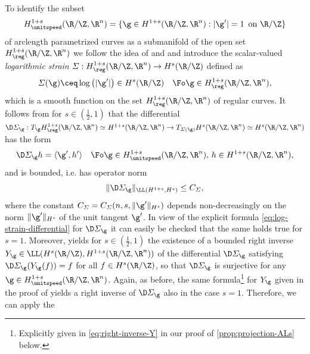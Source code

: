 To identify the subset 
\begin{equation}\label{eq:arclenth-set}
H^{1+s}_\unitspeed(\R/\Z,\R^n)=\{\g\in H^{1+s}(\R/\Z,\R^n):|\g'|=1\,
\textnormal{
on $\R/\Z$}\}
\end{equation}
of arclength parametrized curves as a submanifold of the open set
$H^{1+s}_\reg(\R/\Z,\R^n)$ we follow the idea of 
\cite[Section 2]{scholtes-etal_2022} and
\cite{knappmann-etal_2023} and introduce
the scalar-valued \emph{logarithmic strain}
$\varSigma:H^{1+s}_\reg(\R/\Z,\R^n)\to H^s(\R/\Z)$ defined as
\begin{equation}\label{eq:logarithmic-strain}
	\varSigma(\g) \ceq \log\big( |\g'|\big)  \in H^s(\R/\Z) \quad\Fo \g\in H^{1+s}_\reg(\R/\Z,\R^n),
\end{equation}
which is a smooth function on the set $H^{1+s}_\reg(\R/\Z,\R^n)$ of
regular curves. It follows from \cite[Proposition 5.1]{knappmann-etal_2023}
for $s\in (\frac{1}{2},1)$
that the differential $\D\varSigma_\g:T_\g H^{1+s}_\reg(\R/\Z,\R^n)
\simeq H^{1+s}(\R/\Z,\R^n)\to T_{\varSigma(\g)}H^s(\R/\Z,\R^n)\simeq
H^s(\R/\Z,\R^n)$ has the form
\begin{equation}\label{eq:log-strain-differential}
	\D\varSigma_\g h=\langle\g',h'\rangle \quad\Fo
	\g\in H^{1+s}_\unitspeed(\R/\Z,\R^n),\, h\in H^{1+s}(\R/\Z,\R^n),
\end{equation}
and is bounded, i.e. has operator norm
\begin{equation}\label{eq:log-strain-bounded-differential}
\|\D\varSigma_\g\|_{\LL(H^{1+s},H^s)}\le C_\varSigma,
\end{equation}
where the constant  $C_\varSigma=C_\varSigma(n,s,\|\g'\|_{H^s})$
depends 
non-decreasingly on the norm $\|\g'\|_{H^s}$
of the unit tangent $\g'$. In view of the explicit
formula \cref{eq:log-strain-differential}
for $\D\varSigma_\g$ it can easily be checked that
the same holds true for $s=1$.
Moreover, \cite[Lemma 5.2]{knappmann-etal_2023}
yields for $s\in (\frac{1}{2},1)$
the existence of a bounded right inverse $Y_\g\in
\LL(H^s(\R/\Z),H^{1+s}(\R/\Z,\R^n))$ of the differential $\D\varSigma_\g$ 
satisfying
$\D\varSigma_\g(Y_\g(f))=f$ for all $f\in H^s(\R/\Z)$,
so that $\D\varSigma_\g$ is surjective for any
$\g\in H^{1+s}_\unitspeed(\R/\Z,\R^n)$. Again, as before, 
the same formula\footnote{Explicitly given in \cref{eq:right-inverse-Y}
in our proof
of \cref{prop:projection-ALs} below.}
for $Y_\g$ given in the proof of \cite[Lemma 5.2]{knappmann-etal_2023}
yields a right inverse of $\D\varSigma_\g$
also in the case $s=1$.
Therefore, we can apply the
